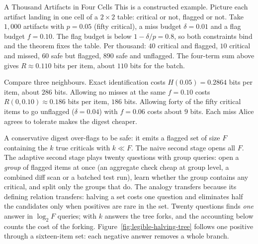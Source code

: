 \documentclass[11pt,a4paper]{article}
\theoremstyle{definition}
\theoremstyle{plain}
\begin{document}
\begin{pdexample}{A Thousand Artifacts in Four Cells}
\setlength{\parskip}{4pt plus 1pt}
This is a constructed example. Picture each artifact landing in one cell of a
$2\times2$ table: critical or not, flagged or not. Take $1{,}000$ artifacts with
$p=0.05$ (fifty critical), a miss budget $\delta=0.01$ and a flag budget
$f=0.10$. The flag budget is below $1-\delta/p=0.8$, so both constraints bind and
the theorem fixes the table. Per thousand: $40$ critical and flagged, $10$
critical and missed, $60$ safe but flagged, $890$ safe and unflagged. The
four-term sum above gives $R\approx0.110$ bits per item, about $110$ bits for
the batch.

Compare three neighbours. Exact identification costs $H(0.05)=0.2864$ bits per
item, about $286$ bits. Allowing no misses at the same $f=0.10$ costs
$R(0,0.10)\approx0.186$ bits per item, $186$ bits. Allowing forty of the fifty
critical items to go unflagged ($\delta=0.04$) with $f=0.06$ costs about $9$ bits.
Each miss Alice agrees to tolerate makes the digest cheaper.
\end{pdexample}

A conservative digest over-flags to be safe: it emits a flagged set of size $F$
containing the $k$ true criticals with $k\ll F$. The naive second stage opens all
$F$. The adaptive second stage plays twenty questions with group queries: open a
\emph{group} of flagged items at once (an aggregate check cheap at group level, a
combined diff scan or a batched test run), learn whether the group contains any
critical, and split only the groups that do. The analogy transfers because its
defining relation transfers: halving a set costs one question and eliminates
half the candidates only when positives are rare in the set. Twenty
questions finds \emph{one} answer in $\log_2 F$ queries; with $k$
answers the tree forks, and the accounting below counts the cost of the
forking. Figure~\ref{fig:legible-halving-tree} follows one positive through
a sixteen-item set: each negative answer removes a whole branch.


\end{document}
